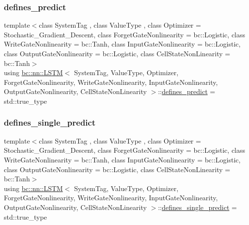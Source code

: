 \mbox{\label{structbc_1_1nn_1_1LSTM_af773cc2ae3cf395af8ce9e921db39ba1}} 
\subsubsection{\texorpdfstring{defines\+\_\+predict}{defines\_predict}}
{\footnotesize\ttfamily template$<$class System\+Tag , class Value\+Type , class Optimizer  = Stochastic\+\_\+\+Gradient\+\_\+\+Descent, class Forget\+Gate\+Nonlinearity  = bc\+::\+Logistic, class Write\+Gate\+Nonlinearity  = bc\+::\+Tanh, class Input\+Gate\+Nonlinearity  = bc\+::\+Logistic, class Output\+Gate\+Nonlinearity  = bc\+::\+Logistic, class Cell\+State\+Non\+Linearity  = bc\+::\+Tanh$>$ \\
using \hyperlink{structbc_1_1nn_1_1LSTM}{bc\+::nn\+::\+L\+S\+TM}$<$ System\+Tag, Value\+Type, Optimizer, Forget\+Gate\+Nonlinearity, Write\+Gate\+Nonlinearity, Input\+Gate\+Nonlinearity, Output\+Gate\+Nonlinearity, Cell\+State\+Non\+Linearity $>$\+::\hyperlink{structbc_1_1nn_1_1LSTM_af773cc2ae3cf395af8ce9e921db39ba1}{defines\+\_\+predict} =  std\+::true\+\_\+type}

\mbox{\label{structbc_1_1nn_1_1LSTM_adaf632d0c0b59449d7e4c2885abf96a8}} 
\subsubsection{\texorpdfstring{defines\+\_\+single\+\_\+predict}{defines\_single\_predict}}
{\footnotesize\ttfamily template$<$class System\+Tag , class Value\+Type , class Optimizer  = Stochastic\+\_\+\+Gradient\+\_\+\+Descent, class Forget\+Gate\+Nonlinearity  = bc\+::\+Logistic, class Write\+Gate\+Nonlinearity  = bc\+::\+Tanh, class Input\+Gate\+Nonlinearity  = bc\+::\+Logistic, class Output\+Gate\+Nonlinearity  = bc\+::\+Logistic, class Cell\+State\+Non\+Linearity  = bc\+::\+Tanh$>$ \\
using \hyperlink{structbc_1_1nn_1_1LSTM}{bc\+::nn\+::\+L\+S\+TM}$<$ System\+Tag, Value\+Type, Optimizer, Forget\+Gate\+Nonlinearity, Write\+Gate\+Nonlinearity, Input\+Gate\+Nonlinearity, Output\+Gate\+Nonlinearity, Cell\+State\+Non\+Linearity $>$\+::\hyperlink{structbc_1_1nn_1_1LSTM_adaf632d0c0b59449d7e4c2885abf96a8}{defines\+\_\+single\+\_\+predict} =  std\+::true\+\_\+type}

